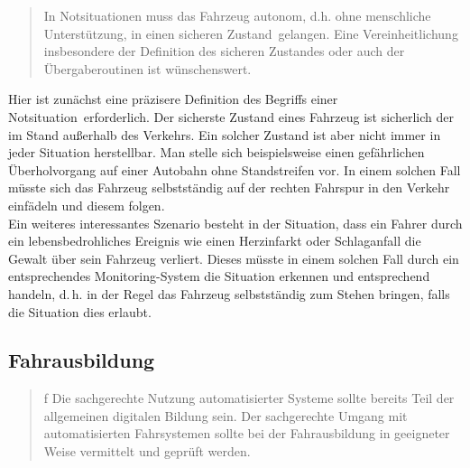 \documentclass[twoside,a4paper,12pt]{article}
\begin{document}
\begin{quote}
\glqq
In Notsituationen muss das Fahrzeug autonom, d.h. ohne menschliche Unterstützung, in
einen \glqq sicheren Zustand\grqq\ gelangen. Eine Vereinheitlichung insbesondere der Definition
des sicheren Zustandes oder auch der Übergaberoutinen ist wünschenswert.\grqq\mbox{~\cite[S. 13]{ek}}
\end{quote}

Hier ist zunächst eine präzisere Definition des Begriffs einer \glqq Notsituation\grqq\ erforderlich. Der sicherste Zustand eines Fahrzeug ist sicherlich der im Stand
außerhalb des Verkehrs. Ein solcher Zustand ist aber nicht immer in jeder Situation herstellbar. Man stelle sich beispielsweise einen gefährlichen Überholvorgang
auf einer Autobahn ohne Standstreifen vor. In einem solchen Fall müsste sich das Fahrzeug selbstständig auf der rechten Fahrspur in den Verkehr einfädeln und 
diesem folgen.\\

Ein weiteres interessantes Szenario besteht in der Situation, dass ein Fahrer durch ein lebensbedrohliches Ereignis wie einen Herzinfarkt oder Schlaganfall
die Gewalt über sein Fahrzeug verliert. Dieses müsste in einem solchen Fall durch ein entsprechendes Monitoring-System die Situation erkennen und entsprechend
\glqq handeln\grqq, d.\,h. in der Regel das Fahrzeug selbstständig zum Stehen bringen, falls die Situation dies erlaubt.\\

\subsection{Fahrausbildung} \label{Fahrausbildung}

\begin{quote}f
\glqq
Die sachgerechte Nutzung automatisierter Systeme sollte bereits Teil der allgemeinen digitalen Bildung sein. Der sachgerechte 
Umgang mit automatisierten Fahrsystemen sollte
bei der Fahrausbildung in geeigneter Weise vermittelt und geprüft werden.\grqq\mbox{~\cite[S. 13]{ek}}
\end{quote}
\end{document}
